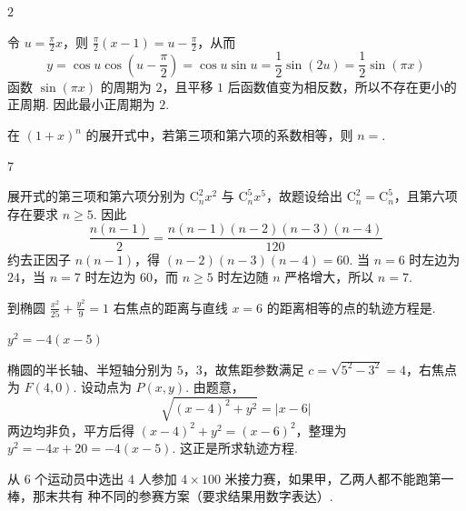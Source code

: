 \begin{answer}
\(2\)
\end{answer}

\begin{solution}
令 \(u=\frac\pi2x\)，则 \(\frac\pi2(x-1)=u-\frac\pi2\)，从而
\[
y=\cos u\cos\left(u-\frac\pi2\right)=\cos u\sin u=\frac12\sin(2u)=\frac12\sin(\pi x)
\]
函数 \(\sin(\pi x)\) 的周期为 \(2\)，且平移 \(1\) 后函数值变为相反数，所以不存在更小的正周期. 因此最小正周期为 \(2\).
\end{solution}

\begin{problem}
在 \((1+x)^n\) 的展开式中，若第三项和第六项的系数相等，则 \(n=\)\fillinblank{}.
\end{problem}

\begin{answer}
\(7\)
\end{answer}

\begin{solution}
展开式的第三项和第六项分别为 \(\mathrm C_n^2x^2\) 与 \(\mathrm C_n^5x^5\)，故题设给出 \(\mathrm C_n^2=\mathrm C_n^5\)，且第六项存在要求 \(n\geqslant5\). 因此
\[
\frac{n(n-1)}2=\frac{n(n-1)(n-2)(n-3)(n-4)}{120}
\]
约去正因子 \(n(n-1)\)，得 \((n-2)(n-3)(n-4)=60\). 当 \(n=6\) 时左边为 \(24\)，当 \(n=7\) 时左边为 \(60\)，而 \(n\geqslant5\) 时左边随 \(n\) 严格增大，所以 \(n=7\).
\end{solution}

\begin{problem}
到椭圆 \(\frac{x^2}{25}+\frac{y^2}{9}=1\) 右焦点的距离与直线 \(x=6\) 的距离相等的点的轨迹方程是\fillinblank{}.
\end{problem}

\begin{answer}
\(y^2=-4(x-5)\)
\end{answer}

\begin{solution}
椭圆的半长轴、半短轴分别为 \(5\)，\(3\)，故焦距参数满足 \(c=\sqrt{5^2-3^2}=4\)，右焦点为 \(F(4,0)\). 设动点为 \(P(x,y)\). 由题意，
\[
\sqrt{(x-4)^2+y^2}=|x-6|
\]
两边均非负，平方后得 \((x-4)^2+y^2=(x-6)^2\)，整理为 \(y^2=-4x+20=-4(x-5)\). 这正是所求轨迹方程.
\end{solution}

\begin{problem}
从 \(6\) 个运动员中选出 \(4\) 人参加 \(4\times100\text{ 米}\)接力赛，如果甲，乙两人都不能跑第一棒，那末共有\fillinblank{} 种不同的参赛方案（要求结果用数字表达）.
\end{problem}

